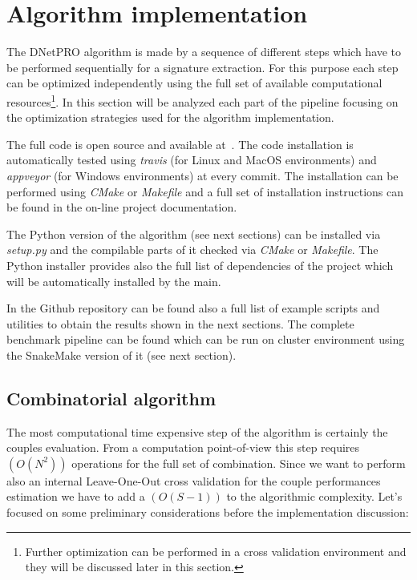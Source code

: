 \documentclass{standalone}
\begin{document}
\section[DNetPRO Implementation]{Algorithm implementation}\label{implementation}

The DNetPRO algorithm is made by a sequence of different steps which have to be performed sequentially for a signature extraction.
For this purpose each step can be optimized independently using the full set of available computational resources\footnote{
Further optimization can be performed in a cross validation environment and they will be discussed later in this section.
}.
In this section will be analyzed each part of the pipeline focusing on the optimization strategies used for the algorithm implementation.

The full code is open source and available at~\cite{DNetPRO}.
The code installation is automatically tested using \emph{travis} (for Linux and MacOS environments) and \emph{appveyor} (for Windows environments) at every commit.
The installation can be performed using \emph{CMake} or \emph{Makefile} and a full set of installation instructions can be found in the on-line project documentation.

The Python version of the algorithm (see next sections) can be installed via \emph{setup.py} and the compilable parts of it checked via \emph{CMake} or \emph{Makefile}.
The Python installer provides also the full list of dependencies of the project which will be automatically installed by the main.

In the Github repository can be found also a full list of example scripts and utilities to obtain the results shown in the next sections.
The complete benchmark pipeline can be found which can be run on cluster environment using the SnakeMake version of it (see next section).


\subsection[Pairs evaluation]{Combinatorial algorithm}\label{implementation:couples}

The most computational time expensive step of the algorithm is certainly the couples evaluation.
From a computation point-of-view this step requires $(O(N^2))$ operations for the full set of combination.
Since we want to perform also an internal Leave-One-Out cross validation for the couple performances estimation we have to add a $(O(S-1))$ to the algorithmic complexity.
Let's focused on some preliminary considerations before the implementation discussion:
\end{document}
